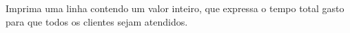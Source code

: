 Imprima uma linha contendo um valor inteiro, que expressa o tempo total gasto para que todos os clientes sejam atendidos.
